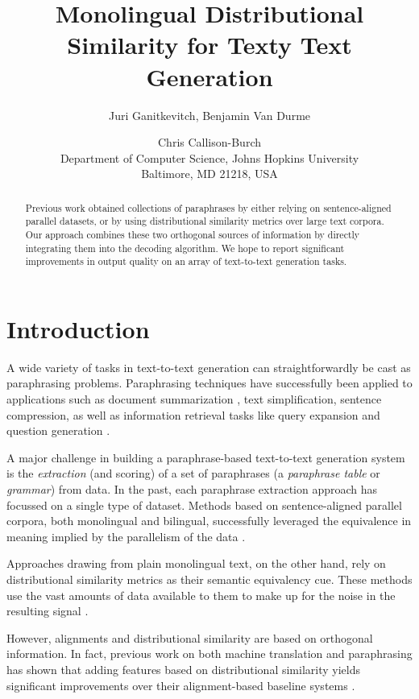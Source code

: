 \documentclass[11pt]{article}
\author{Juri Ganitkevitch, Benjamin Van Durme \and
  Chris Callison-Burch \\
  Department of Computer Science, Johns Hopkins University \\
  Baltimore, MD 21218, USA}
\title{Monolingual Distributional Similarity for Texty Text Generation}
\begin{document}
\maketitle

\begin{abstract}
  Previous work obtained collections of paraphrases by either relying
  on sentence-aligned parallel datasets, or by using distributional
  similarity metrics over large text corpora. Our approach combines
  these two orthogonal sources of information by directly integrating
  them into the decoding algorithm. We hope to report significant
  improvements in output quality on an array of text-to-text
  generation tasks.
\end{abstract}

\section{Introduction}

A wide variety of tasks in text-to-text generation can
straightforwardly be cast as paraphrasing problems. Paraphrasing
techniques have successfully been applied to applications such as
document summarization \cite{Barzilay1999,BarzilayThesis}, text
simplification, sentence compression, as well as information
retrieval tasks like query expansion and question generation
\cite{mckeown:1979:ACL,Anick1999,Ravichandran2002,Riezler2007}.

A major challenge in building a paraphrase-based text-to-text
generation system is the \emph{extraction} (and scoring) of a set of
paraphrases (a \emph{paraphrase table} or \emph{grammar}) from
data. In the past, each paraphrase extraction approach has focussed on
a single type of dataset. Methods based on sentence-aligned parallel
corpora, both monolingual and bilingual, successfully leveraged the
equivalence in meaning implied by the parallelism of the data
\cite{Barzilay2001,Pang2003,Callison-Burch2005,Madnani2007,cohn-lapata:2008,Zhao2008}.

Approaches drawing from plain monolingual text, on the other hand,
rely on distributional similarity metrics as their semantic
equivalency cue. These methods use the vast amounts of data available
to them to make up for the noise in the resulting signal
\cite{Lin2001,Bhagat2008}.

However, alignments and distributional similarity are based on
orthogonal information. In fact, previous work on both machine
translation and paraphrasing has shown that adding features based on
distributional similarity yields significant improvements over their
alignment-based baseline systems \cite{Chan2011,Klementiev2012}.
\end{document}
